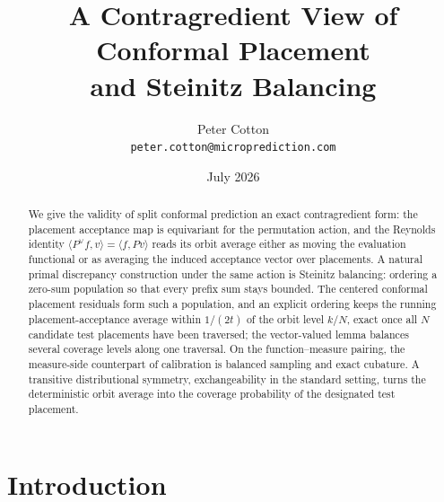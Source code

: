 \documentclass[11pt]{article}
\title{A Contragredient View of Conformal Placement\\and Steinitz Balancing}
\author{Peter Cotton\\\texttt{peter.cotton@microprediction.com}}
\date{July 2026}
\theoremstyle{remark}
\begin{document}
\maketitle

\begin{center}
\end{center}
\vspace{6pt}

\begin{abstract}
We give the validity of split conformal prediction an exact contragredient form: the placement
acceptance map is equivariant for the permutation action, and the Reynolds identity
$\langle P^{\vee}f,v\rangle=\langle f,Pv\rangle$ reads its orbit average either as moving the
evaluation functional or as averaging the induced acceptance vector over placements. A natural
primal discrepancy construction under the same action is Steinitz balancing: ordering a
zero-sum population so that every prefix sum stays bounded. The centered conformal placement
residuals form such a population, and an explicit ordering keeps the running
placement-acceptance average within $1/(2t)$ of the orbit level
$k/N$, exact once all $N$ candidate test placements have been traversed; the vector-valued
lemma balances several coverage levels along
one traversal. On the function--measure pairing, the measure-side counterpart
of calibration is balanced sampling and exact cubature. A transitive distributional symmetry,
exchangeability in the standard setting, turns the deterministic orbit average into the
coverage probability of the designated test placement.
\end{abstract}

\section{Introduction}\label{sec:intro}
\end{document}
